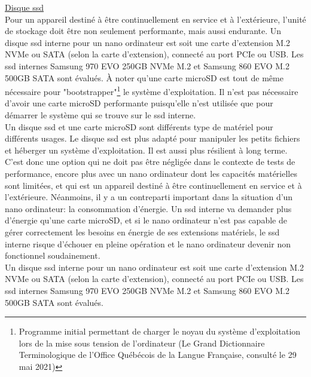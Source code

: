 \par\underline{Disque \acrshort{ssd}}
\vspace{\baselineskip}
\\
\noindent Pour un appareil destiné à être continuellement en service et à l'extérieure, l'unité de stockage doit être non seulement performante, mais aussi endurante. Un disque \acrshort{ssd} interne pour un nano ordinateur est soit une carte d'extension M.2 NVMe ou SATA (selon la carte d'extension), connecté au port PCIe ou USB. Les \acrshort{ssd} internes Samsung 970 EVO 250GB NVMe M.2 et Samsung 860 EVO M.2 500GB SATA sont évalués. À noter qu'une carte microSD est tout de même nécessaire pour "bootstrapper"\footnote{Programme initial permettant de charger le noyau du système d'exploitation lors de la mise sous tension de l'ordinateur (Le Grand Dictionnaire Terminologique de l'Office Québécois de la Langue Française, consulté le 29 mai 2021)} le système d'exploitation. Il n'est pas nécessaire d'avoir une carte microSD performante puisqu'elle n'est utilisée que pour démarrer le système qui se trouve sur le \acrshort{ssd} interne. 
\vspace{\baselineskip}
\\
\noindent Un disque \acrshort{ssd} et une carte microSD sont différents type de matériel pour différents usages. Le disque \acrshort{ssd} est plus adapté pour manipuler les petits fichiers et héberger un système d'exploitation. Il est aussi plus résilient à long terme. C'est donc une option qui ne doit pas être négligée dans le contexte de tests de performance, encore plus avec un nano ordinateur dont les capacités matérielles sont limitées, et qui est un appareil destiné à être continuellement en service et à l'extérieure. Néanmoins, il y a un contreparti important dans la situation d'un nano ordinateur: la consommation d'énergie. Un \acrshort{ssd} interne va demander plus d'énergie qu'une carte microSD, et si le nano ordinateur n'est pas capable de gérer correctement les besoins en énergie de ses extensions matériels, le \acrshort{ssd} interne risque d'échouer en pleine opération et le nano ordinateur devenir non fonctionnel soudainement.
\vspace{\baselineskip}
\\
\noindent Un disque \acrshort{ssd} interne pour un nano ordinateur est soit une carte d'extension M.2 NVMe ou SATA (selon la carte d'extension), connecté au port PCIe ou USB. Les \acrshort{ssd} internes Samsung 970 EVO 250GB NVMe M.2 et Samsung 860 EVO M.2 500GB SATA sont évalués.
